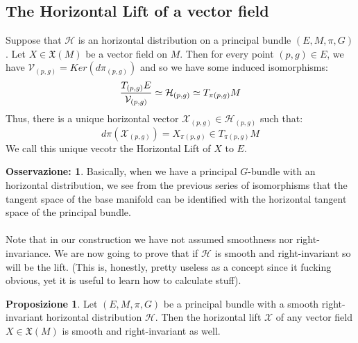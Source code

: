 \documentclass[12pt,a4paper]{report}
\theoremstyle{definition}
\theoremstyle{Theorem}
\newtheorem{Prop}[Def]{Proposizione}
\theoremstyle{definition}
\theoremstyle{definition}
\theoremstyle{definition}
\newtheorem{Obs}[Def]{Osservazione:}
\begin{document}
		\subsection{The Horizontal Lift of a vector field}
		Suppose that $\mathcal{H}$ is an horizontal distribution on a principal bundle $(E,M,\pi,G)$. Let $X\in\mathfrak{X}(M)$ be a vector field on $M$. Then for every point $(p,g)\in E$, we have $\mathcal{V}_{(p,g)}=Ker(d\pi_{(p,g)})$ and so we have some induced isomorphisms:
		$${T_{(p,g)}E\over \mathcal{V}_{(p,g)}}\simeq \mathcal{H}_{(p,g)}\simeq T_{\pi(p,g)}M$$
		Thus, there is a unique horizontal vector $\mathcal{X}_{(p,g)}\in\mathcal{H}_{(p,g)}$ such that:
		$$d\pi(\mathcal{X}_{(p,g)})=X_{\pi(p,g)}\in T_{\pi(p,g)}M$$
		We call this unique vecotr the Horizontal Lift of $X$ to $E$.
		\begin{Obs}
			Basically, when we have a principal $G$-bundle with an horizontal distribution, we see from the previous series of isomorphisms that the tangent space of the base manifold can  be identified with the horizontal tangent space of the principal bundle.\\
			\\
			Note that in our construction we have not assumed smoothness nor right-invariance. We are now going to prove that if $\mathcal{H}$ is smooth and right-invariant so will be the lift. (This is, honestly, pretty useless as a concept since it fucking obvious, yet it is useful to learn how to calculate stuff).
		\end{Obs}
		\begin{Prop}
			Let $(E,M,\pi,G)$ be a principal bundle with a smooth right-invariant horizontal distribution $\mathcal{H}$. Then the horizontal lift $\mathcal{X}$ of any vector field $X\in\mathfrak{X}(M)$ is smooth and right-invariant as well.
		\end{Prop}
\end{document}
